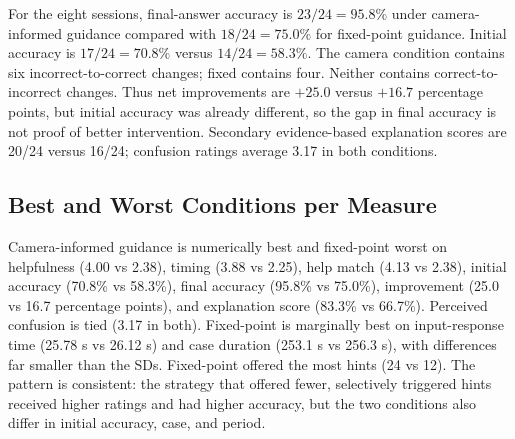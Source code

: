 \documentclass[conference]{IEEEtran}
\begin{document}
For the eight sessions, final-answer accuracy is $23/24=95.8\%$ under camera-informed guidance compared with $18/24=75.0\%$ for fixed-point guidance. Initial accuracy is $17/24=70.8\%$ versus $14/24=58.3\%$. The camera condition contains six incorrect-to-correct changes; fixed contains four. Neither contains correct-to-incorrect changes. Thus net improvements are $+25.0$ versus $+16.7$ percentage points, but initial accuracy was already different, so the gap in final accuracy is not proof of better intervention. Secondary evidence-based explanation scores are 20/24 versus 16/24; confusion ratings average 3.17 in both conditions.

\begin{table}[t]
\caption{Recorded event counts (24 checkpoints per condition) and case duration (8 cases per condition). Speech-delivery flags were not populated in the exported logs and are not reported.}
\label{tab:events}
\centering\footnotesize
{}
\end{table}

\subsection{Best and Worst Conditions per Measure}
Camera-informed guidance is numerically best and fixed-point worst on helpfulness (4.00 vs 2.38), timing (3.88 vs 2.25), help match (4.13 vs 2.38), initial accuracy (70.8\% vs 58.3\%), final accuracy (95.8\% vs 75.0\%), improvement (25.0 vs 16.7 percentage points), and explanation score (83.3\% vs 66.7\%). Perceived confusion is tied (3.17 in both). Fixed-point is marginally best on input-response time (25.78 s vs 26.12 s) and case duration (253.1 s vs 256.3 s), with differences far smaller than the SDs. Fixed-point offered the most hints (24 vs 12). The pattern is consistent: the strategy that offered fewer, selectively triggered hints received higher ratings and had higher accuracy, but the two conditions also differ in initial accuracy, case, and period.
\end{document}
